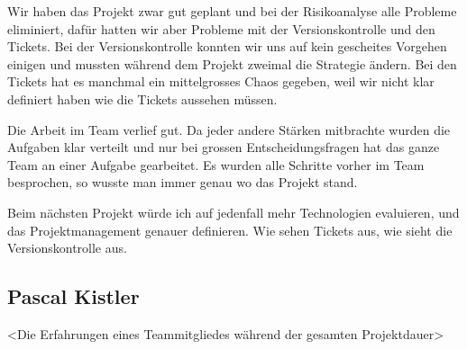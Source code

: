 \documentclass[11pt]{scrartcl}
\begin{document}
Wir haben das Projekt zwar gut geplant und bei der Risikoanalyse alle Probleme eliminiert, dafür hatten wir aber Probleme mit der Versionskontrolle und den Tickets. Bei der Versionskontrolle konnten wir uns auf kein gescheites Vorgehen einigen und mussten während dem Projekt zweimal die Strategie ändern. Bei den Tickets hat es manchmal ein mittelgrosses Chaos gegeben, weil wir nicht klar definiert haben wie die Tickets aussehen müssen.

Die Arbeit im Team verlief gut. Da jeder andere Stärken mitbrachte wurden die Aufgaben klar verteilt und nur bei grossen Entscheidungsfragen hat das ganze Team an einer Aufgabe gearbeitet. Es wurden alle Schritte vorher im Team besprochen, so wusste man immer genau wo das Projekt stand.

Beim nächsten Projekt würde ich auf jedenfall mehr Technologien evaluieren, und das Projektmanagement genauer definieren. Wie sehen Tickets aus, wie sieht die Versionskontrolle aus.
\newpage
\subsection{Pascal Kistler}
<Die Erfahrungen eines Teammitgliedes während der gesamten Projektdauer>
\end{document}
